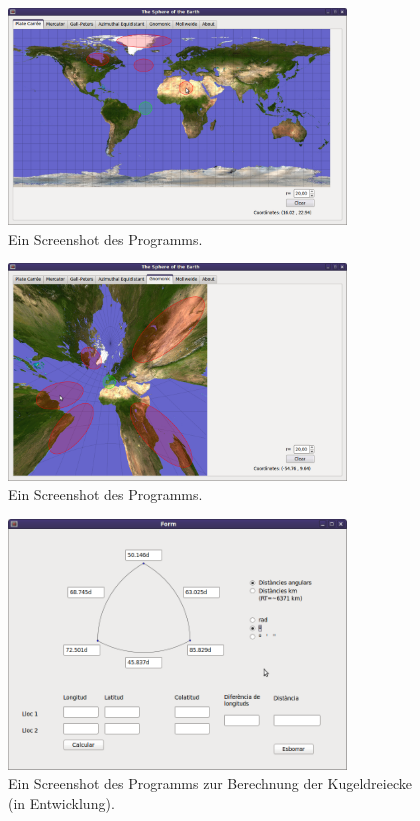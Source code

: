 \documentclass[a4paper,12pt]{article}
\begin{document}
\begin{figure}[ht]
\begin{center}
\includegraphics[width=0.8\textwidth]{../common/soe1.png}
\caption{Ein Screenshot des Programms.}
\end{center}
\end{figure}
 
 \begin{figure}[ht]
\begin{center}
\includegraphics[width=0.8\textwidth]{../common/soe2.png}
\caption{Ein Screenshot des Programms.}
\end{center}
\end{figure}

 
 \begin{figure}[ht]
\begin{center}
\includegraphics[width=0.8\textwidth]{../common/triang.png}
\caption{Ein Screenshot des Programms zur Berechnung der Kugeldreiecke (in Entwicklung).} 
\label{fig-sphtri}
\end{center}
\end{figure}
 
\end{document}
